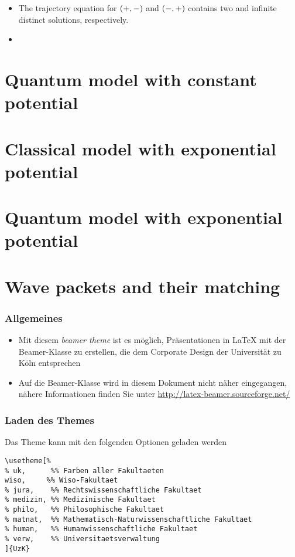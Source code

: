 \documentclass[9pt]{beamer}
\begin{document}
\begin{itemize}
\item The trajectory equation for ${\left(+,-\right)}$ and ${\left(-,+\right)}$ contains two and infinite
distinct solutions, respectively.

\item 

\end{itemize}



\section{Quantum model with constant potential}

\section{Classical model with exponential potential}

\section{Quantum model with exponential potential}

\section{Wave packets and their matching}

\begin{frame}
  \frametitle{Allgemeines}

  \begin{itemize}
  \item Mit diesem \emph{beamer theme} ist es möglich, Präsentationen in
    \LaTeX{} mit der Beamer-Klasse zu erstellen, die dem Corporate Design der
    Universität zu Köln entsprechen
  \item Auf die Beamer-Klasse wird in diesem Dokument nicht näher eingegangen,
    nähere Informationen finden Sie unter
    \url{http://latex-beamer.sourceforge.net/}
  \end{itemize}

\end{frame}

\begin{frame}[fragile]
  \frametitle{Laden des Themes}
  \begin{block}{Das Theme kann mit den folgenden Optionen geladen werden}
    \begin{small}
\begin{verbatim}
\usetheme[%
% uk,      %% Farben aller Fakultaeten
wiso,     %% Wiso-Fakultaet
% jura,    %% Rechtswissenschaftliche Fakultaet
% medizin, %% Medizinische Fakultaet
% philo,   %% Philosophische Fakultaet
% matnat,  %% Mathematisch-Naturwissenschaftliche Fakultaet
% human,   %% Humanwissenschaftliche Fakultaet
% verw,    %% Universitaetsverwaltung
]{UzK}
\end{verbatim}
    \end{small}

  \end{block}
\end{frame}
\end{document}
